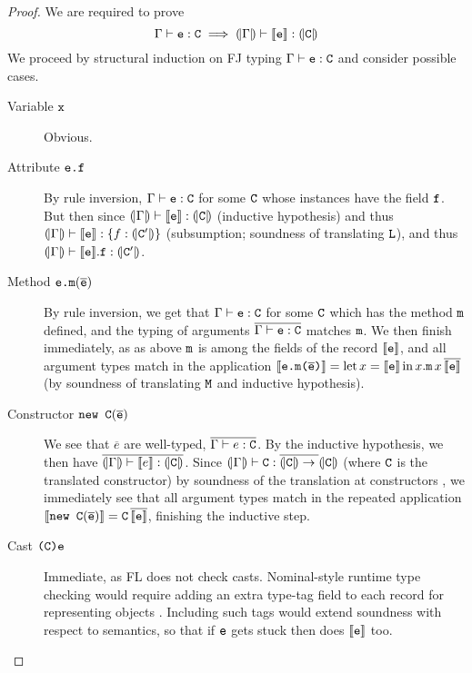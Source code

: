 \begin{proof}
We are required to prove 
$$\Gamma \vdash \fj e : \fj C \implies \denoty \Gamma \vdash \denot{\fj e} : \denoty{\fj C}$$
We proceed by structural induction on FJ typing $\Gamma \vdash \texttt{e} : \texttt{C}$ and consider possible cases.
\begin{description}
    \item[Variable $\texttt{x}$] Obvious.
    \item[Attribute $\texttt{e.f}$] By rule inversion, $\Gamma \vdash \texttt{e} : \texttt{C}$ for some $\texttt{C}$ whose instances have the field $\texttt{f}$. But then since $\denoty{\Gamma} \vdash \denot{\fj e} : \denoty{\fj C}$ (inductive hypothesis) and thus $\denoty{\Gamma} \vdash \denot{\fj e} : \flrec{f : \denoty{\fj C'}}$ (subsumption; soundness of translating $\texttt{L}$), and thus $\denoty{\Gamma} \vdash \denot{\fj e}{.}{\fj f} : \denoty{\fj C'}$.
    \item[Method $\texttt{e.m}(\overline {\texttt{e}})$] By rule inversion, we get that $\Gamma \vdash \texttt{e} : \texttt{C}$ for some $\texttt{C}$ which has the method $\texttt{m}$ defined, and the typing of arguments $\overline{\Gamma \vdash \texttt{e} : \texttt{C}}$ matches $\texttt{m}$. We then finish immediately, as as above $\texttt{m}$ is among the fields of the record $\denot{\fj e}$, and all argument types match in the application $\denot{\fj {e.m(\fjoverline e)}} = \fllet{x}{\denot{\fj e}} \flproj{x}{\fj m}\,x\,\overline{\denot{\fj e}}$ (by soundness of translating $\texttt{M}$ and inductive hypothesis).
    \item[Constructor $\texttt{new C}(\overline{\texttt{e}})$] We see that $\overline{e}$ are well-typed, \ie{} $\overline{\Gamma \vdash e : \texttt{C}}$. By the inductive hypothesis, we then have $\overline{\denoty{\Gamma} \vdash \denot{e} : \denoty{\fj C}}$. Since $\denoty{\Gamma} \vdash \fj C : \overline{\denoty{\fj C} \to {}} \denoty{\fj C}$ (where $\texttt{C}$ is the translated constructor) by soundness of the  translation at constructors , we immediately see that all argument types match in the repeated application $\denot{\fj{new C}(\overline{\fj e})} = \fj{C}\,\overline{\denot{\fj e}}$, finishing the inductive step.  
    \item[Cast $\texttt{(C)e}$] Immediate, as FL does not check casts. Nominal-style runtime type checking would require adding an extra type-tag field to each record for representing objects \cite{tapl}. Including such tags would extend soundness with respect to semantics, so that if $\texttt{e}$ gets stuck then does $\denot{\fj e}$ too.
\end{description}
\end{proof}

